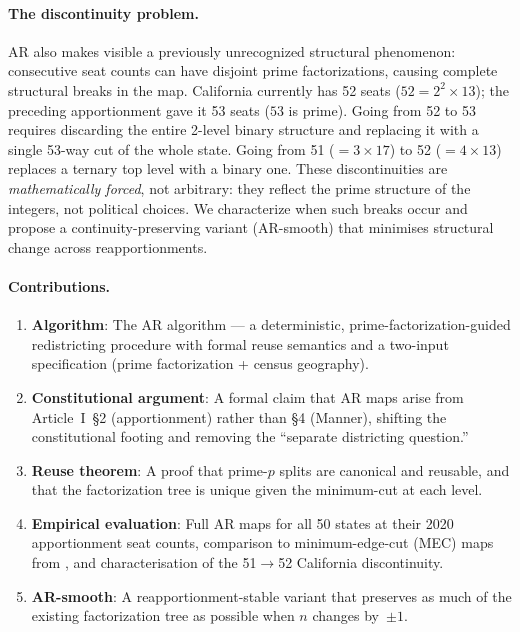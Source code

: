 \paragraph{The discontinuity problem.}
AR also makes visible a previously unrecognized structural phenomenon:
consecutive seat counts can have disjoint prime factorizations, causing
complete structural breaks in the map. California currently has 52 seats
($52 = 2^2 \times 13$); the preceding apportionment gave it 53 seats
($53$ is prime). Going from 52 to 53 requires discarding the entire
2-level binary structure and replacing it with a single 53-way cut of the
whole state. Going from 51 ($= 3 \times 17$) to 52 ($= 4 \times 13$)
replaces a ternary top level with a binary one. These discontinuities are
\emph{mathematically forced}, not arbitrary: they reflect the prime
structure of the integers, not political choices. We characterize when such
breaks occur and propose a continuity-preserving variant (AR-smooth) that
minimises structural change across reapportionments.

\paragraph{Contributions.}
\begin{enumerate}
  \item \textbf{Algorithm}: The AR algorithm --- a deterministic,
        prime-factorization-guided redistricting procedure with formal
        reuse semantics and a two-input specification (prime factorization
        + census geography).
  \item \textbf{Constitutional argument}: A formal claim that AR maps
        arise from Article~I~\S2 (apportionment) rather than \S4 (Manner),
        shifting the constitutional footing and removing the ``separate
        districting question.''
  \item \textbf{Reuse theorem}: A proof that prime-$p$ splits are
        canonical and reusable, and that the factorization tree is unique
        given the minimum-cut at each level.
  \item \textbf{Empirical evaluation}: Full AR maps for all 50 states at
        their 2020 apportionment seat counts, comparison to minimum-edge-cut
        (MEC) maps from \citet{dellaLibera2026mec}, and characterisation of
        the 51$\to$52 California discontinuity.
  \item \textbf{AR-smooth}: A reapportionment-stable variant that preserves
        as much of the existing factorization tree as possible when $n$
        changes by~$\pm 1$.
\end{enumerate}
